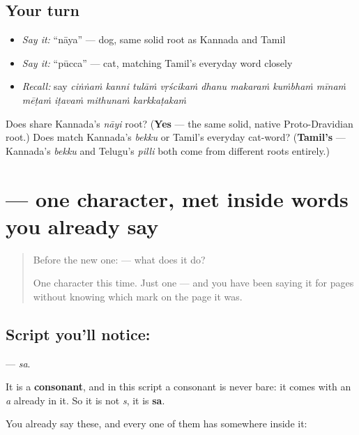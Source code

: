 \subsection*{Your turn}
\begin{itemize}
\raggedright
  \item \emph{Say it:} \textquotedblleft{}nāya\textquotedblright{} — dog, same solid root as Kannada and Tamil
  \item \emph{Say it:} \textquotedblleft{}pūcca\textquotedblright{} — cat, matching Tamil's everyday word closely
  \item \emph{Recall:} say \emph{ciṅṅaṁ kanni tulāṁ vṛścikaṁ dhanu makaraṁ kuṁbhaṁ mīnaṁ mēṭaṁ iṭavaṁ mithunaṁ karkkaṭakaṁ}
\end{itemize}

\begin{tcolorbox}[breakable,colback=teal!4,colframe=teal!35!black,title={Before you move on}]
Does \textbf{} share Kannada's \emph{nāyi} root? (\textbf{Yes} — the same solid, native Proto-Dravidian root.) Does \textbf{} match Kannada's \emph{bekku} or Tamil's everyday cat-word? (\textbf{Tamil's} — Kannada's \emph{bekku} and Telugu's \emph{pilli} both come from different roots entirely.)
\end{tcolorbox}
\section[\texorpdfstring{\ml{സ} (sa)}{സ (sa)}]{ — one character, met inside words you already say}

\label{lesson:ML-S124-letter-sa}



\begin{quote}
Before the new one:  — what does it do?

One character this time. Just one — and you have been saying it for pages without knowing which mark on the page it was.
\end{quote}

\subsection*{Script you'll notice: }
\textbf{} — \emph{sa}.

It is a \textbf{consonant}, and in this script a consonant is never bare: it comes with an \emph{a} already in it. So it is not \emph{s}, it is \textbf{sa}.

You already say these, and every one of them has  somewhere inside it:


